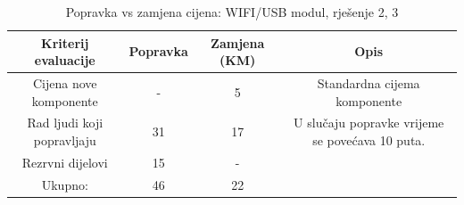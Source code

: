 \documentclass[12pt]{article}
\begin{document}
\begin{landscape}
\begin{table}[htbp]
  \centering
  \footnotesize
  \caption{Popravka vs zamjena cijena: WIFI/USB modul, rješenje 2, 3}
    \begin{tabular}{cccc}
    \toprule
    Kriterij evaluacije & Popravka & Zamjena (KM) & Opis \\
    \midrule
     Cijena nove komponente & -     & 5     & \multicolumn{1}{p{23.215em}}{Standardna \newline{}cijema\newline{} komponente} \\
    \midrule
    Rad ljudi koji popravljaju & 31    & 17    & \multicolumn{1}{p{23.215em}}{ U slučaju popravke vrijeme se povećava 10 puta. } \\
    \midrule
    Rezrvni dijelovi & 15    & -     &  \\
    \midrule
    Ukupno: & 46    & 22    &  \\
    \bottomrule
    \end{tabular}%
  \label{tab:addlabel}%
\end{table}%

\vspace*{\fill}
\end{landscape}
\end{document}
